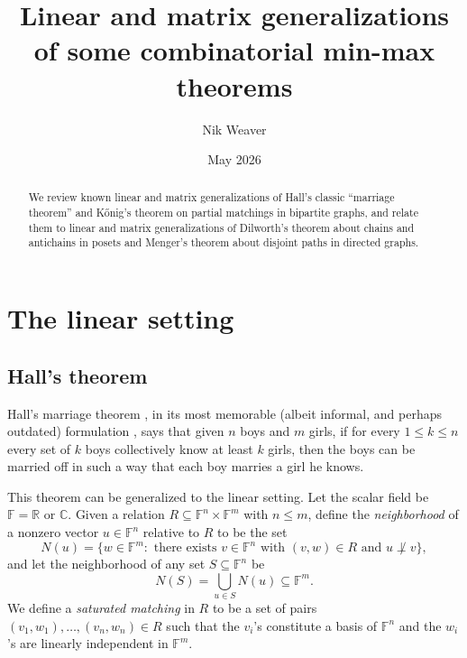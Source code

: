 \documentclass{amsart}
\title[Linear and matrix min-max theorems]{Linear and matrix generalizations of some combinatorial min-max theorems}
\author{Nik Weaver}
\date{May 2026}
\theoremstyle{definition}
\begin{document}

\begin{abstract}
We review known linear and matrix generalizations of Hall's classic ``marriage theorem'' and Kőnig's theorem on partial matchings in bipartite graphs, and relate them to linear and matrix generalizations of Dilworth's theorem about chains and antichains in posets and Menger's theorem about disjoint paths in directed graphs.
\end{abstract}

\maketitle

\section{The linear setting}

\subsection{Hall's theorem}

Hall's marriage theorem \cite{hall}, in its most memorable (albeit informal, and perhaps outdated) formulation \cite{HV}, says that given $n$ boys and $m$ girls, if for every $1 \leq k \leq n$ every set of $k$ boys collectively know at least $k$ girls, then the boys can be married off in such a way that each boy marries a girl he knows.

This theorem can be generalized to the linear setting. Let the scalar field be $\mathbb{F} = \mathbb{R}$ or $\mathbb{C}$. Given a relation $R \subseteq \mathbb{F}^n \times \mathbb{F}^m$ with $n \leq m$, define the {\it neighborhood} of a nonzero vector $u \in \mathbb{F}^n$ relative to $R$ to be the set $$N(u) = \{w \in \mathbb{F}^m:\mbox{ there exists }v \in \mathbb{F}^n\mbox{ with }(v,w) \in R\mbox{ and }u \not\perp v\},$$ and let the neighborhood of any set $S \subseteq \mathbb{F}^n$ be $$N(S) = \bigcup_{u \in S} N(u) \subseteq \mathbb{F}^m.$$ We define a {\it saturated matching} in $R$ to be a set of pairs $(v_1,w_1), \ldots, (v_n,w_n) \in R$ such that the $v_i$'s constitute a basis of $\mathbb{F}^n$ and the $w_i$'s are linearly independent in $\mathbb{F}^m$.
\end{document}
